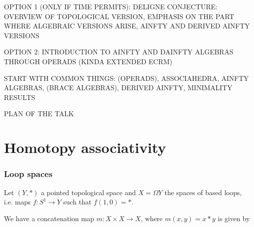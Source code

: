 \documentclass{beamer}
\title{}
\author{Javier Aguilar Mart\'in}
\institute{University of Kent}
\date{}
\theoremstyle{definition}
\begin{document}
\frame{\titlepage}


\begin{frame}
OPTION 1 (ONLY IF TIME PERMITS):
DELIGNE CONJECTURE: OVERVIEW OF TOPOLOGICAL VERSION, EMPHASIS ON THE PART WHERE ALGEBRAIC VERSIONS ARISE, AINFTY AND DERIVED AINFTY VERSIONS

OPTION 2:
INTRODUCTION TO AINFTY AND DAINFTY ALGEBRAS THROUGH OPERADS (KINDA EXTENDED ECRM)

START WITH COMMON THINGS: (OPERADS), ASSOCIAHEDRA, AINFTY ALGEBRAS, (BRACE ALGEBRAS), DERIVED AINFTY, MINIMALITY RESULTS


\end{frame}

\begin{frame}
PLAN OF THE TALK
\end{frame}




\section{Homotopy associativity}
\begin{frame}
\frametitle{Loop spaces}


Let $(Y,*)$ a pointed topological space and $X = \Omega Y$ the spaces of based loops, i.e. maps $f:S^1\to Y$ such that $f(1,0)=*$.\pause %

We have a concatenation map $m:X\times  X\to  X$, where $m(x,y)=x*y$ is given by\pause

\end{frame}
\end{document}
